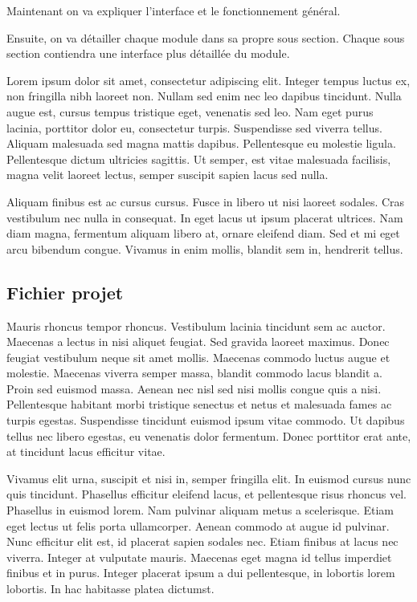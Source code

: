 		Maintenant on va expliquer l'interface et le fonctionnement général.

		Ensuite, on va détailler chaque module dans sa propre sous section. Chaque sous section contiendra une interface plus détaillée du module.

		Lorem ipsum dolor sit amet, consectetur adipiscing elit. Integer tempus luctus ex, non fringilla nibh laoreet non. Nullam sed enim nec leo dapibus tincidunt. Nulla augue est, cursus tempus tristique eget, venenatis sed leo. Nam eget purus lacinia, porttitor dolor eu, consectetur turpis. Suspendisse sed viverra tellus. Aliquam malesuada sed magna mattis dapibus. Pellentesque eu molestie ligula. Pellentesque dictum ultricies sagittis. Ut semper, est vitae malesuada facilisis, magna velit laoreet lectus, semper suscipit sapien lacus sed nulla.

		Aliquam finibus est ac cursus cursus. Fusce in libero ut nisi laoreet sodales. Cras vestibulum nec nulla in consequat. In eget lacus ut ipsum placerat ultrices. Nam diam magna, fermentum aliquam libero at, ornare eleifend diam. Sed et mi eget arcu bibendum congue. Vivamus in enim mollis, blandit sem in, hendrerit tellus.


	\subsection{Fichier projet}

		Mauris rhoncus tempor rhoncus. Vestibulum lacinia tincidunt sem ac auctor. Maecenas a lectus in nisi aliquet feugiat. Sed gravida laoreet maximus. Donec feugiat vestibulum neque sit amet mollis. Maecenas commodo luctus augue et molestie. Maecenas viverra semper massa, blandit commodo lacus blandit a. Proin sed euismod massa. Aenean nec nisl sed nisi mollis congue quis a nisi. Pellentesque habitant morbi tristique senectus et netus et malesuada fames ac turpis egestas. Suspendisse tincidunt euismod ipsum vitae commodo. Ut dapibus tellus nec libero egestas, eu venenatis dolor fermentum. Donec porttitor erat ante, at tincidunt lacus efficitur vitae.

		Vivamus elit urna, suscipit et nisi in, semper fringilla elit. In euismod cursus nunc quis tincidunt. Phasellus efficitur eleifend lacus, et pellentesque risus rhoncus vel. Phasellus in euismod lorem. Nam pulvinar aliquam metus a scelerisque. Etiam eget lectus ut felis porta ullamcorper. Aenean commodo at augue id pulvinar. Nunc efficitur elit est, id placerat sapien sodales nec. Etiam finibus at lacus nec viverra. Integer at vulputate mauris. Maecenas eget magna id tellus imperdiet finibus et in purus. Integer placerat ipsum a dui pellentesque, in lobortis lorem lobortis. In hac habitasse platea dictumst. 

